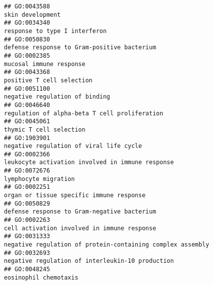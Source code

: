 \documentclass[
]{article}
\begin{document}
\begin{verbatim}
## GO:0043588                                                                                                                                 skin development
## GO:0034340                                                                                                                    response to type I interferon
## GO:0050830                                                                                                      defense response to Gram-positive bacterium
## GO:0002385                                                                                                                          mucosal immune response
## GO:0043368                                                                                                                        positive T cell selection
## GO:0051100                                                                                                                   negative regulation of binding
## GO:0046640                                                                                                    regulation of alpha-beta T cell proliferation
## GO:0045061                                                                                                                          thymic T cell selection
## GO:1903901                                                                                                          negative regulation of viral life cycle
## GO:0002366                                                                                                 leukocyte activation involved in immune response
## GO:0072676                                                                                                                             lymphocyte migration
## GO:0002251                                                                                                         organ or tissue specific immune response
## GO:0050829                                                                                                      defense response to Gram-negative bacterium
## GO:0002263                                                                                                      cell activation involved in immune response
## GO:0031333                                                                                       negative regulation of protein-containing complex assembly
## GO:0032693                                                                                                 negative regulation of interleukin-10 production
## GO:0048245                                                                                                                            eosinophil chemotaxis

\end{verbatim}
\end{document}
